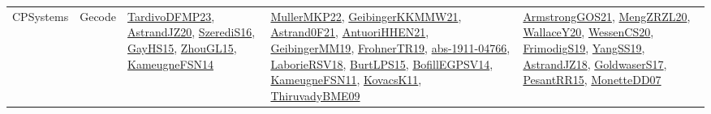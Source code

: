 {\begin{longtable}{lp{3cm}>{\raggedright}p{6cm}>{\raggedright}p{6cm}p{8cm}}
CPSystems & Gecode & \href{papers/TardivoDFMP23.pdf}{TardivoDFMP23}\cite{TardivoDFMP23}, \href{articles/AstrandJZ20.pdf}{AstrandJZ20}\cite{AstrandJZ20}, \href{papers/SzerediS16.pdf}{SzerediS16}\cite{SzerediS16}, \href{papers/GayHS15.pdf}{GayHS15}\cite{GayHS15}, \href{papers/ZhouGL15.pdf}{ZhouGL15}\cite{ZhouGL15}, \href{articles/KameugneFSN14.pdf}{KameugneFSN14}\cite{KameugneFSN14} & \href{articles/MullerMKP22.pdf}{MullerMKP22}\cite{MullerMKP22}, \href{papers/GeibingerKKMMW21.pdf}{GeibingerKKMMW21}\cite{GeibingerKKMMW21}, \href{papers/Astrand0F21.pdf}{Astrand0F21}\cite{Astrand0F21}, \href{papers/AntuoriHHEN21.pdf}{AntuoriHHEN21}\cite{AntuoriHHEN21}, \href{papers/GeibingerMM19.pdf}{GeibingerMM19}\cite{GeibingerMM19}, \href{papers/FrohnerTR19.pdf}{FrohnerTR19}\cite{FrohnerTR19}, \href{articles/abs-1911-04766.pdf}{abs-1911-04766}\cite{abs-1911-04766}, \href{articles/LaborieRSV18.pdf}{LaborieRSV18}\cite{LaborieRSV18}, \href{papers/BurtLPS15.pdf}{BurtLPS15}\cite{BurtLPS15}, \href{papers/BofillEGPSV14.pdf}{BofillEGPSV14}\cite{BofillEGPSV14}, \href{papers/KameugneFSN11.pdf}{KameugneFSN11}\cite{KameugneFSN11}, \href{articles/KovacsK11.pdf}{KovacsK11}\cite{KovacsK11}, \href{papers/ThiruvadyBME09.pdf}{ThiruvadyBME09}\cite{ThiruvadyBME09} & \href{papers/ArmstrongGOS21.pdf}{ArmstrongGOS21}\cite{ArmstrongGOS21}, \href{articles/MengZRZL20.pdf}{MengZRZL20}\cite{MengZRZL20}, \href{articles/WallaceY20.pdf}{WallaceY20}\cite{WallaceY20}, \href{papers/WessenCS20.pdf}{WessenCS20}\cite{WessenCS20}, \href{papers/FrimodigS19.pdf}{FrimodigS19}\cite{FrimodigS19}, \href{papers/YangSS19.pdf}{YangSS19}\cite{YangSS19}, \href{papers/AstrandJZ18.pdf}{AstrandJZ18}\cite{AstrandJZ18}, \href{papers/GoldwaserS17.pdf}{GoldwaserS17}\cite{GoldwaserS17}, \href{papers/PesantRR15.pdf}{PesantRR15}\cite{PesantRR15}, \href{papers/MonetteDD07.pdf}{MonetteDD07}\cite{MonetteDD07}\\

\end{longtable}}
